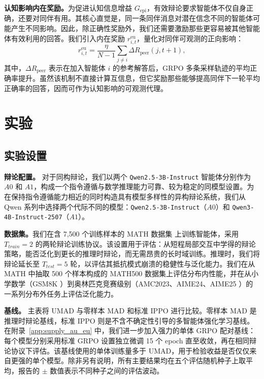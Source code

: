 \documentclass{article}
\theoremstyle{plain}
\theoremstyle{definition}
\theoremstyle{remark}
\begin{document}
\textbf{认知影响内在奖励。}为促进认知信息增益 $G_{\text{epi}}$，有效辩论要求智能体不仅自身正确，还要对同伴有用。其核心直觉是，同一条同伴消息对潜在信念不同的智能体可能产生不同影响。因此，除正确性奖励外，我们还需要激励那些更容易被其他智能体有效利用的回答。我们引入内在奖励 $r^{\text{eu}}_{i,t}$，量化对同伴可观测的正向影响：
\begin{equation} r^{\text{eu}}_{i,t} = \frac{\eta}{N-1} \sum_{j \neq i} \Delta R_{\text{peer}}(j, t+1), \end{equation} 
其中，$\Delta R_{\text{peer}}$ 表示在加入智能体 $i$ 的参考解答后，GRPO 多条采样轨迹的平均正确率提升。虽然该机制不直接计算互信息，但它奖励那些能够提高同伴下一轮平均正确率的回答，因而可作为认知影响的可观测代理。


\section{实验}
\label{sec:experiments}

\subsection{实验设置}
\textbf{辩论配置。}
对于同构辩论，我们以两个 \texttt{Qwen2.5-3B-Instruct} 智能体分别作为 $A0$ 和 $A1$，构成一个指令遵循与数学推理能力可靠、较为稳定的同模型设置。为在保持指令遵循能力相近的同时构造具有模型多样性的异构辩论系统，我们从 Qwen 系列中选择两个代际不同的模型：\texttt{Qwen2.5-3B-Instruct}（$A0$）和 \texttt{Qwen3-4B-Instruct-2507}（$A1$）\cite{yang2024qwen2,yang2025qwen3}。

\textbf{数据集。}我们在含 7,500 个训练样本的 MATH 数据集 \cite{hendrycks2021measuring} 上训练智能体，采用 $T_{train}=2$ 的两轮辩论训练协议。该设置用于评估：从短程局部交互中学得的辩论策略，能否泛化到更长的推理时辩论，而无需昂贵的长时域训练。推理时，我们将辩论延长至 $T_{test}=5$ 轮，以评估其抵抗模式崩溃的稳健性与泛化能力。我们在从 MATH 中抽取 500 个样本构成的 MATH500 数据集上评估分布内性能，并在从小学数学（GSM8K \cite{cobbe2021training}）到奥林匹克竞赛级别（AMC2023、AIME24、AIME25 \cite{amc2023,aops_aime_2024, aops_aime_2025}）的一系列分布外任务上评估泛化能力。



\textbf{基线。}
主表将 UMAD 与零样本 MAD 和标准 IPPO 进行比较。零样本 MAD 是推理时辩论基线，标准 IPPO 则是不含不确定性引导的多智能体强化学习基线。在附录~\ref{app:supply_au_eu} 中，我们进一步加入强力的单体 GRPO 配对基线：每个模型分别采用标准 GRPO 设置独立微调 15 个 epoch 直至收敛，再在相同辩论协议下评估。该基线使用的单体训练量多于 UMAD，用于检验收益是否仅仅来自更强的单个模型。除非另有说明，所有主要结果均在五个评估随机种子上取平均，报告的 $\pm$ 数值表示不同种子之间的评估波动。
\end{document}

